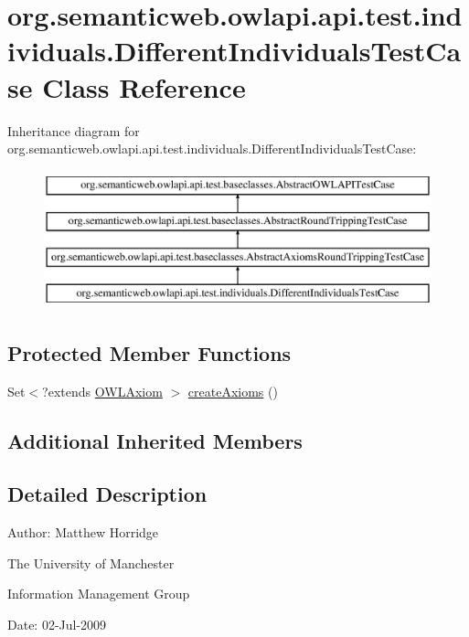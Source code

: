 \hypertarget{classorg_1_1semanticweb_1_1owlapi_1_1api_1_1test_1_1individuals_1_1_different_individuals_test_case}{\section{org.\-semanticweb.\-owlapi.\-api.\-test.\-individuals.\-Different\-Individuals\-Test\-Case Class Reference}
\label{classorg_1_1semanticweb_1_1owlapi_1_1api_1_1test_1_1individuals_1_1_different_individuals_test_case}
}
Inheritance diagram for org.\-semanticweb.\-owlapi.\-api.\-test.\-individuals.\-Different\-Individuals\-Test\-Case\-:\begin{figure}[H]
\begin{center}
\leavevmode
\includegraphics[height=4.000000cm]{classorg_1_1semanticweb_1_1owlapi_1_1api_1_1test_1_1individuals_1_1_different_individuals_test_case}
\end{center}
\end{figure}
\subsection*{Protected Member Functions}
\begin{DoxyCompactItemize}
\item 
Set$<$?extends \hyperlink{interfaceorg_1_1semanticweb_1_1owlapi_1_1model_1_1_o_w_l_axiom}{O\-W\-L\-Axiom} $>$ \hyperlink{classorg_1_1semanticweb_1_1owlapi_1_1api_1_1test_1_1individuals_1_1_different_individuals_test_case_a3100742811ff0e5444f254d8ba7bb335}{create\-Axioms} ()
\end{DoxyCompactItemize}
\subsection*{Additional Inherited Members}


\subsection{Detailed Description}
Author\-: Matthew Horridge\par
 The University of Manchester\par
 Information Management Group\par
 Date\-: 02-\/\-Jul-\/2009 

